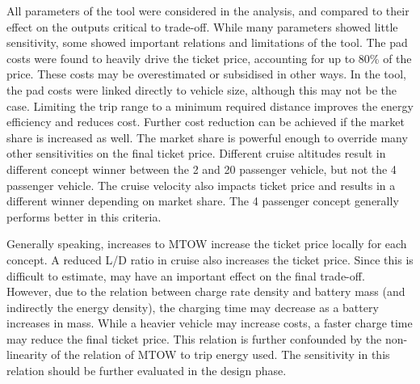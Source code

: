 All parameters of the tool were considered in the analysis, and compared to their effect on the outputs critical to trade-off. While many parameters showed little sensitivity, some showed important relations and limitations of the tool. The pad costs were found to heavily drive the ticket price, accounting for up to 80\% of the price. These costs may be overestimated or subsidised in other ways. In the tool, the pad costs were linked directly to vehicle size, although this may not be the case. Limiting the trip range to a minimum required distance improves the energy efficiency and reduces cost. Further cost reduction can be achieved if the market share is increased as well. The market share is powerful enough to override many other sensitivities on the final ticket price. Different cruise altitudes result in different concept winner between the 2 and 20 passenger vehicle, but not the 4 passenger vehicle. The cruise velocity also impacts ticket price and results in a different winner depending on market share. The 4 passenger concept generally performs better in this criteria. 

Generally speaking, increases to MTOW increase the ticket price locally for each concept. A reduced L/D ratio in cruise also increases the ticket price. Since this is difficult to estimate, may have an important effect on the final trade-off. However, due to the relation between charge rate density and battery mass (and indirectly the energy density), the charging time may decrease as a battery increases in mass. While a heavier vehicle may increase costs, a faster charge time may reduce the final ticket price. This relation is further confounded by the non-linearity of the relation of MTOW to trip energy used. The sensitivity in this relation should be further evaluated in the design phase.







